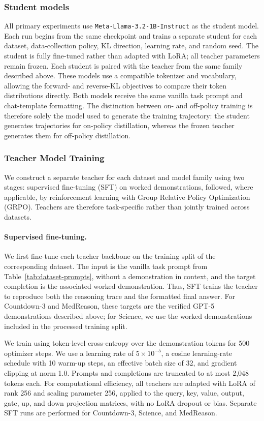 \documentclass{article} %
\theoremstyle{plain}
\theoremstyle{definition}
\theoremstyle{remark}
\begin{document}
\subsubsection{Student models}
All primary experiments use \texttt{Meta-Llama-3.2-1B-Instruct} as the student model. Each run begins from the same checkpoint and trains a separate student for each dataset, data-collection policy, KL direction, learning rate, and random seed. The student is fully fine-tuned rather than adapted with LoRA; all teacher parameters remain frozen. Each student is paired with the teacher from the same family described above. These models use a compatible tokenizer and vocabulary, allowing the forward- and reverse-KL objectives to compare their token distributions directly. Both models receive the same vanilla task prompt and chat-template formatting. The distinction between on- and off-policy training is therefore solely the model used to generate the training trajectory: the student generates trajectories for on-policy distillation, whereas the frozen teacher generates them for off-policy distillation.

\subsubsection{Teacher Model Training}
\label{app:details:trained_teacher}

We construct a separate teacher for each dataset and model family using two stages: supervised fine-tuning (SFT) on worked demonstrations, followed, where applicable, by reinforcement learning with Group Relative Policy Optimization (GRPO). Teachers are therefore task-specific rather than jointly trained across datasets.

\paragraph{Supervised fine-tuning.}
We first fine-tune each teacher backbone on the training split of the corresponding dataset. The input is the vanilla task prompt from Table~\ref{tab:dataset-prompts}, without a demonstration in context, and the target completion is the associated worked demonstration. Thus, SFT trains the teacher to reproduce both the reasoning trace and the formatted final answer. For Countdown-3 and MedReason, these targets are the verified GPT-5 demonstrations described above; for Science, we use the worked demonstrations included in the processed training split.

We train using token-level cross-entropy over the demonstration tokens for 500 optimizer steps. We use a learning rate of \(5\times10^{-5}\), a cosine learning-rate schedule with 10 warm-up steps, an effective batch size of 32, and gradient clipping at norm 1.0. Prompts and completions are truncated to at most 2,048 tokens each. For computational efficiency, all teachers are adapted with LoRA of rank 256 and scaling parameter 256, applied to the query, key, value, output, gate, up, and down projection matrices, with no LoRA dropout or bias. Separate SFT runs are performed for Countdown-3, Science, and MedReason.
\end{document}
